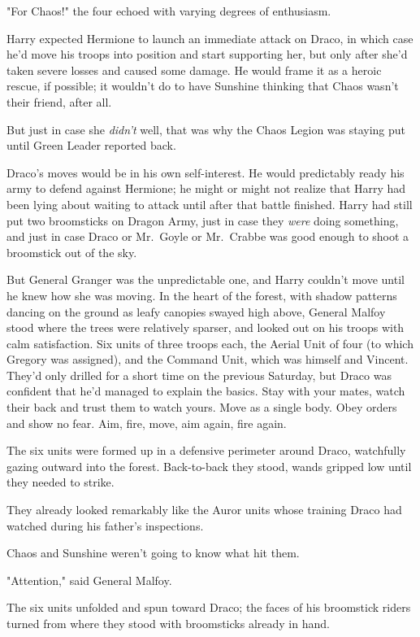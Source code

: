 "For Chaos!" the four echoed with varying degrees of enthusiasm.

Harry expected Hermione to launch an immediate attack on Draco, in which case
he'd move his troops into position and start supporting her, but only after
she'd taken severe losses and caused some damage. He would frame it as a heroic
rescue, if possible; it wouldn't do to have Sunshine thinking that Chaos wasn't
their friend, after all.

But just in case she \emph{didn't}{\el} well, that was why the Chaos Legion
was staying put until Green Leader reported back.

Draco's moves would be in his own self-interest. He would predictably ready his
army to defend against Hermione; he might or might not realize that Harry had
been lying about waiting to attack until after that battle finished. Harry had
still put two broomsticks on Dragon Army, just in case they \emph{were} doing
something, and just in case Draco or Mr.~Goyle or Mr.~Crabbe was good enough to
shoot a broomstick out of the sky.

But General Granger was the unpredictable one, and Harry couldn't move until he
knew how she was moving.
\sbreak
In the heart of the forest, with shadow patterns dancing on the ground as leafy
canopies swayed high above, General Malfoy stood where the trees were
relatively sparser, and looked out on his troops with calm satisfaction. Six
units of three troops each, the Aerial Unit of four (to which Gregory was
assigned), and the Command Unit, which was himself and Vincent. They'd only
drilled for a short time on the previous Saturday, but Draco was confident that
he'd managed to explain the basics. Stay with your mates, watch their back and
trust them to watch yours. Move as a single body. Obey orders and show no fear.
Aim, fire, move, aim again, fire again.

The six units were formed up in a defensive perimeter around Draco, watchfully
gazing outward into the forest. Back-to-back they stood, wands gripped low
until they needed to strike.

They already looked remarkably like the Auror units whose training Draco had
watched during his father's inspections.

Chaos and Sunshine weren't going to know what hit them.

"Attention," said General Malfoy.

The six units unfolded and spun toward Draco; the faces of his broomstick
riders turned from where they stood with broomsticks already in hand.

